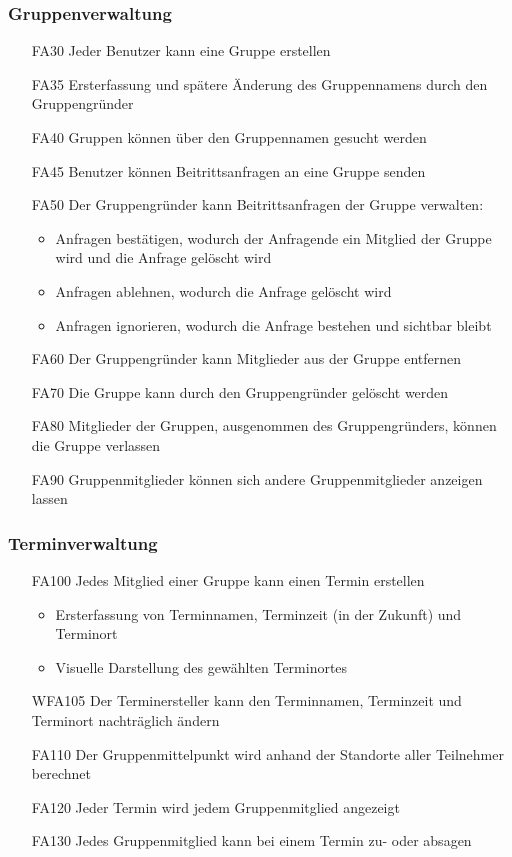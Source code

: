 \documentclass{scrartcl}
\begin{document}
	\subsubsection{Gruppenverwaltung}
	\begin{itemize}
		\item[FA30] Jeder Benutzer kann eine Gruppe erstellen
		\item[FA35] Ersterfassung und spätere Änderung des Gruppennamens durch den Gruppengründer
		\item[FA40] Gruppen können über den Gruppennamen gesucht werden
		\item[FA45] Benutzer können Beitrittsanfragen an eine Gruppe senden
		\item[FA50] Der Gruppengründer kann Beitrittsanfragen der Gruppe verwalten:
		\begin{itemize}
			\item Anfragen bestätigen, wodurch der Anfragende ein Mitglied der Gruppe wird und die Anfrage gelöscht wird
			\item Anfragen ablehnen, wodurch die Anfrage gelöscht wird
			\item Anfragen ignorieren, wodurch die Anfrage bestehen und sichtbar bleibt
		\end{itemize}
		\item[FA60] Der Gruppengründer kann Mitglieder aus der Gruppe entfernen
		\item[FA70] Die Gruppe kann durch den Gruppengründer gelöscht werden
		\item[FA80] Mitglieder der Gruppen, ausgenommen des Gruppengründers, können die Gruppe verlassen
		\item[FA90] Gruppenmitglieder können sich andere Gruppenmitglieder anzeigen lassen
	\end{itemize}
	
	\subsubsection{Terminverwaltung}
	\begin{itemize}
		\item[FA100] Jedes Mitglied einer Gruppe kann einen Termin erstellen
		\begin{itemize}
			\item Ersterfassung von Terminnamen, Terminzeit (in der Zukunft) und Terminort
			\item Visuelle Darstellung des gewählten Terminortes
		\end{itemize}
		\item[WFA105] Der Terminersteller kann den Terminnamen, Terminzeit und Terminort nachträglich ändern
		\item[FA110] Der Gruppenmittelpunkt wird anhand der Standorte aller Teilnehmer berechnet		
		\item[FA120] Jeder Termin wird jedem Gruppenmitglied angezeigt
		\item[FA130] Jedes Gruppenmitglied kann bei einem Termin zu- oder absagen
		
	\end{itemize}
	
\end{document}
